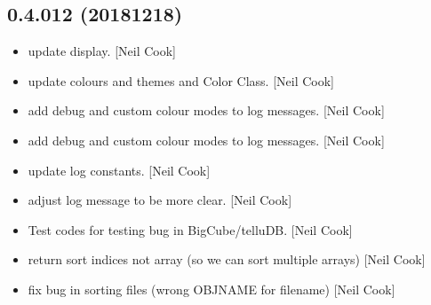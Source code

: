 \documentclass[a4paper,10pt,english]{report}
\begin{document}
\subsection{0.4.012 (2018\sphinxhyphen{}12\sphinxhyphen{}18)}
\label{\detokenize{misc/changelog:id247}}\begin{itemize}
\item {} 
 \sphinxhyphen{} update display. {[}Neil Cook{]}

\item {} 
 \sphinxhyphen{} update colours and themes and Color Class. {[}Neil
Cook{]}

\item {} 
 \sphinxhyphen{} add debug and custom colour modes to log messages.
{[}Neil Cook{]}

\item {} 
 \sphinxhyphen{} add debug and custom colour modes to log messages.
{[}Neil Cook{]}

\item {} 
 \sphinxhyphen{} update log constants. {[}Neil Cook{]}

\item {} 
 \sphinxhyphen{} adjust log message to be more clear. {[}Neil
Cook{]}

\item {} 
Test codes for testing bug in BigCube/telluDB. {[}Neil Cook{]}

\item {} 
 \sphinxhyphen{} return sort indices not array (so we can
sort multiple arrays) {[}Neil Cook{]}

\item {} 
 \sphinxhyphen{} fix bug in sorting files (wrong OBJNAME for
filename) {[}Neil Cook{]}

\end{itemize}
\end{document}
